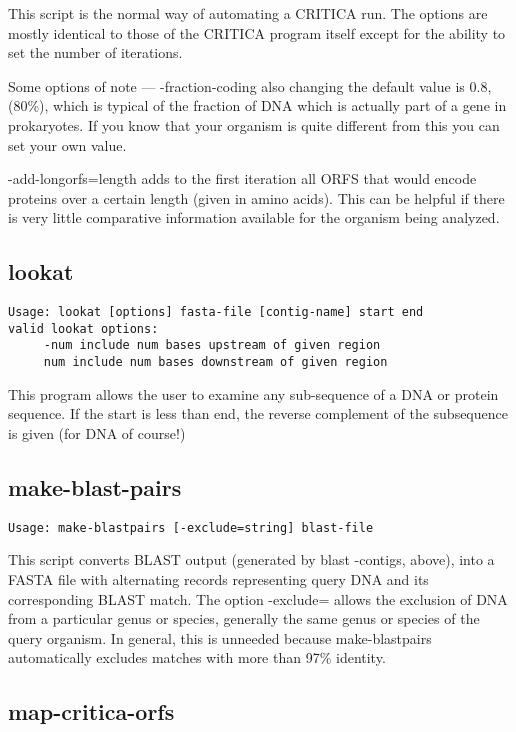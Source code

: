 \documentclass{article}
\begin{document}
This script is the normal way of automating a CRITICA run. The options
are mostly identical to those of the CRITICA program itself except for
the ability to set the number of iterations.

Some options of note --- -fraction-coding also changing the
default value is 0.8, (80\%), which is typical of the fraction of DNA
which is actually part of a gene in prokaryotes. If you know that your
organism is quite different from this you can set your own value.

-add-longorfs=length adds to the first iteration all ORFS that
would encode proteins over a certain length (given in amino
acids). This can be helpful if there is very little comparative
information available for the organism being analyzed.

\subsection{lookat}

\begin{verbatim}
Usage: lookat [options] fasta-file [contig-name] start end
valid lookat options:
     -num include num bases upstream of given region
     num include num bases downstream of given region
\end{verbatim}

This program allows the user to examine any sub-sequence of a DNA or
protein sequence. If the start is less than end, the reverse complement
of the subsequence is given (for DNA of course!)

\subsection{make-blast-pairs}

\begin{verbatim}
Usage: make-blastpairs [-exclude=string] blast-file
\end{verbatim}

This script converts BLAST output (generated by blast -contigs,
above), into a FASTA file with alternating records representing query
DNA and its corresponding BLAST match. The option -exclude=
allows the exclusion of DNA from a particular genus or species,
generally the same genus or species of the query organism. In general,
this is unneeded because make-blastpairs automatically excludes
matches with more than 97\% identity.

\subsection{map-critica-orfs}
\end{document}

